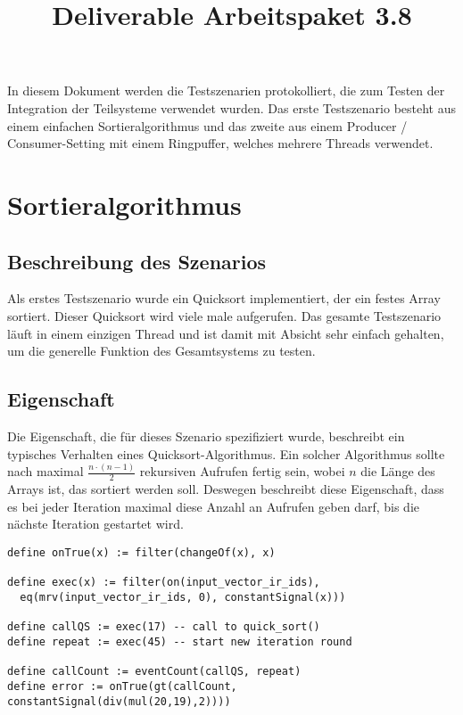 \documentclass{article}
\title{Deliverable Arbeitspaket 3.8}
\title{\thetitle}
\begin{document}
\maketitle

In diesem Dokument werden die Testszenarien protokolliert, die zum Testen der Integration der Teilsysteme verwendet wurden. Das erste Testszenario besteht aus einem einfachen Sortieralgorithmus und das zweite aus einem Producer / Consumer-Setting mit einem Ringpuffer, welches mehrere Threads verwendet.

\section{Sortieralgorithmus}

\subsection{Beschreibung des Szenarios}

Als erstes Testszenario wurde ein Quicksort implementiert, der ein festes Array sortiert. Dieser Quicksort wird viele male aufgerufen. Das gesamte Testszenario läuft in einem einzigen Thread und ist damit mit Absicht sehr einfach gehalten, um die generelle Funktion des Gesamtsystems zu testen.

\subsection{Eigenschaft}

Die Eigenschaft, die für dieses Szenario spezifiziert wurde, beschreibt ein typisches Verhalten eines Quicksort-Algorithmus. Ein solcher Algorithmus sollte nach maximal $\frac{n \cdot (n - 1)}{2}$ rekursiven Aufrufen fertig sein, wobei $n$ die Länge des Arrays ist, das sortiert werden soll. Deswegen beschreibt diese Eigenschaft, dass es bei jeder Iteration maximal diese Anzahl an Aufrufen geben darf, bis die nächste Iteration gestartet wird.

\begin{lstlisting}[language=tessla+salt]
define onTrue(x) := filter(changeOf(x), x)

define exec(x) := filter(on(input_vector_ir_ids), 
  eq(mrv(input_vector_ir_ids, 0), constantSignal(x)))

define callQS := exec(17) -- call to quick_sort()
define repeat := exec(45) -- start new iteration round

define callCount := eventCount(callQS, repeat)
define error := onTrue(gt(callCount, constantSignal(div(mul(20,19),2))))
\end{lstlisting}
\end{document}
